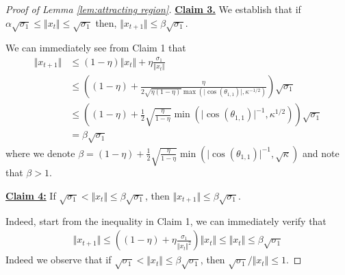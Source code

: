 \begin{proof}[Proof of Lemma \ref{lem:attracting region}]
\underline{\textbf{Claim 3.}} We establish that if $
    \alpha \sqrt{\sigma_1} \le \Vert x_t \Vert \le \sqrt{\sigma_1}$
then, $ \Vert x_{t+1} \Vert \le  \beta \sqrt{\sigma_1}$. 

\medskip 

We can immediately see from Claim 1 that 
\begin{align}
    \Vert x_{t+1} \Vert & \le (1 - \eta) \Vert x_t \Vert + \eta \frac{\sigma_1}{\Vert x_t \Vert} \\
    & \le \left((1-\eta) + \frac{\eta}{2\sqrt{\eta(1-\eta)} \max(\vert \cos(\theta_{1,1} )\vert, \kappa^{-1/2} )}\right)  \sqrt{\sigma_1} \\
    & \le \left( (1-\eta) + \frac{1}{2}\sqrt{\frac{\eta}{1-\eta}} \min(\vert \cos(\theta_{1,1})\vert^{-1}, \kappa^{1/2} )\right) \sqrt{\sigma_1} \\
    & = \beta \sqrt{\sigma_1}
\end{align}
where we denote $\beta = (1-\eta) + \frac{1}{2}\sqrt{\frac{\eta}{1-\eta}} \min(\vert \cos(\theta_{1,1})\vert^{-1}, \sqrt{\kappa} ) $  and note that  $\beta >  1$. 

\medskip

\underline{\textbf{Claim 4:}} If $ \sqrt{\sigma_1} <  \Vert x_t \Vert  \le \beta \sqrt{\sigma_1}$, then $\Vert x_{t+1} \Vert \le \beta \sqrt{\sigma_1}$.

\medskip 

Indeed, start from the inequality in Claim 1, we can immediately verify that 
\begin{align}
    \Vert x_{t+1} \Vert \le \left( (1 - \eta) + \eta\frac{\sigma_1}{\Vert x_t \Vert^2 }\right) \Vert x_t \Vert \le \Vert x_t \Vert \le \beta \sqrt{\sigma_1}    
\end{align}
Indeed we observe that if $ \sqrt{\sigma_1} <  \Vert x_t \Vert  \le \beta \sqrt{\sigma_1}$, then  $\sqrt{\sigma_1} / \Vert x_t \Vert \le 1 $.



\medskip 



\end{proof}
